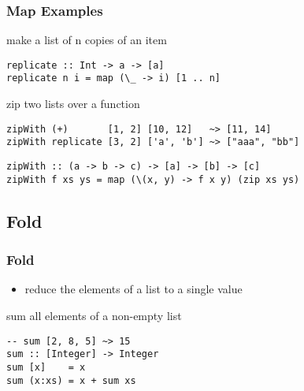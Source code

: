 \documentclass[dvipsnames]{beamer}
\theoremstyle{plain}
\begin{document}
\begin{frame}[fragile]
  \frametitle{Map Examples}

  \begin{exampleblock}{make a list of n copies of an item}
    \begin{lstlisting}[deletekeywords={replicate}]
replicate :: Int -> a -> [a]
replicate n i = map (\_ -> i) [1 .. n]
    \end{lstlisting}
  \end{exampleblock}

  \pause
  \begin{exampleblock}{zip two lists over a function}
    \begin{lstlisting}[frame=none]
zipWith (+)       [1, 2] [10, 12]   ~> [11, 14]
zipWith replicate [3, 2] ['a', 'b'] ~> ["aaa", "bb"]
    \end{lstlisting}

    \begin{lstlisting}[deletekeywords={zipWith}]
zipWith :: (a -> b -> c) -> [a] -> [b] -> [c]
zipWith f xs ys = map (\(x, y) -> f x y) (zip xs ys)
    \end{lstlisting}
  \end{exampleblock}
\end{frame}

\subsection{Fold}

\begin{frame}[fragile]
  \frametitle{Fold}

  \begin{itemize}
    \item reduce the elements of a list to a single value
  \end{itemize}

  \begin{exampleblock}{sum all elements of a non-empty list}
    \begin{lstlisting}[deletekeywords={sum}]
-- sum [2, 8, 5] ~> 15
sum :: [Integer] -> Integer
sum [x]    = x
sum (x:xs) = x + sum xs
    \end{lstlisting}
  \end{exampleblock}
\end{frame}
\end{document}
